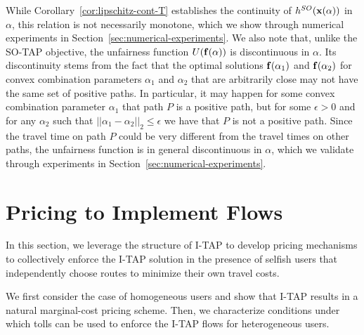 \documentclass{article}
\newif\ifarxiv   %
\begin{document}
While Corollary~\ref{cor:lipschitz-cont-T} establishes the continuity of $h^{SO}(\mathbf{x}(\alpha))$ in $\alpha$, this relation is not necessarily monotone, which we show through numerical experiments in Section~\ref{sec:numerical-experiments}. We also note that, unlike the SO-TAP objective, the unfairness function $U(\mathbf{f}(\alpha))$ is discontinuous in $\alpha$. Its discontinuity stems from the fact that the optimal solutions $\mathbf{f}(\alpha_1)$ and $\mathbf{f}(\alpha_2)$ for convex combination parameters $\alpha_1$ and $\alpha_2$ that are arbitrarily close may not have the same set of positive paths. In particular, it may happen for some convex combination parameter $\alpha_1$ that path $P$ is a positive path, but for some $\epsilon>0$ and for any $\alpha_2$ such that $||\alpha_1 - \alpha_2 ||_2 \leq \epsilon$ we have that $P$ is not a positive path. Since the travel time on path $P$ could be very different from the travel times on other paths, the unfairness function is in general discontinuous in $\alpha$, which we validate through experiments in Section~\ref{sec:numerical-experiments}.
\fi  

\section{Pricing to Implement Flows} \label{sec:main-pricing}



\ifarxiv  In the previous section we presented a method for computing a solution to \fso that keeps within a $\beta$ bound of unfairness and strives to minimize the total travel time. \fi 
In this section, we leverage the structure of
I-TAP to develop pricing mechanisms to collectively enforce
the I-TAP solution in the presence of selfish users that independently choose routes to minimize their own travel costs. %
\ifarxiv  That is, the prices are set such that the travel cost for users in the same commodity is equivalent, ensuring the formation of an equilibrium. \fi 
We first consider the case of homogeneous users and show that I-TAP results in a natural marginal-cost pricing scheme. \ifarxiv Then, we leverage a linear programming methodology of \cite{multicommodity-extension} to set road prices to enforce the flows computed through the I-TAP method for the setting of heterogeneous users. \else Then, we characterize conditions under which tolls can be used to enforce the I-TAP flows for heterogeneous users. \fi
\end{document}
